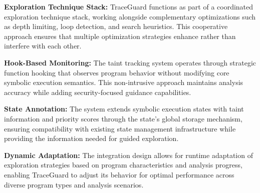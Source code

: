 \textbf{Exploration Technique Stack:} TraceGuard functions as part of a coordinated exploration technique stack, working alongside complementary optimizations such as depth limiting, loop detection, and search heuristics. This cooperative approach ensures that multiple optimization strategies enhance rather than interfere with each other.

\textbf{Hook-Based Monitoring:} The taint tracking system operates through strategic function hooking that observes program behavior without modifying core symbolic execution semantics. This non-intrusive approach maintains analysis accuracy while adding security-focused guidance capabilities.

\textbf{State Annotation:} The system extends symbolic execution states with taint information and priority scores through the state's global storage mechanism, ensuring compatibility with existing state management infrastructure while providing the information needed for guided exploration.

\textbf{Dynamic Adaptation:} The integration design allows for runtime adaptation of exploration strategies based on program characteristics and analysis progress, enabling TraceGuard to adjust its behavior for optimal performance across diverse program types and analysis scenarios.
